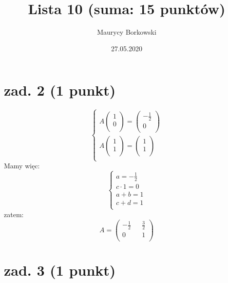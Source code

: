 \documentclass{article}
\title{Lista 10 (suma: 15 punktów)}
\date{27.05.2020}
\author{Maurycy Borkowski}
\begin{document}
\maketitle
\section{zad. 2 (1 punkt)}
$$
\begin{cases}
A
\begin{pmatrix}
1\\
0\\
\end{pmatrix}
= 
\begin{pmatrix}
-\frac{1}{2}\\
0\\
\end{pmatrix}\\
A
\begin{pmatrix}
1\\
1\\
\end{pmatrix}
= 
\begin{pmatrix}
1\\
1\\
\end{pmatrix}\\
\end{cases}
$$
Mamy więc:
$$
\begin{cases}
a = -\frac{1}{2}\\
c \cdot 1 = 0\\
a + b = 1\\
c + d = 1\\
\end{cases}
$$
zatem:
$$
A =
\begin{pmatrix}
-\frac{1}{2} && \frac{3}{2}\\
0 && 1\\
\end{pmatrix}
$$
\section{zad. 3 (1 punkt)}
\end{document}
